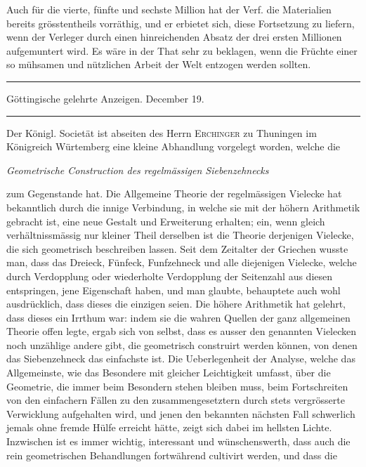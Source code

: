 %
Auch für die vierte, fünfte und sechste Million hat der Verf. die Materialien bereits grösstentheils vorräthig, und er erbietet sich, diese Fortsetzung zu liefern, wenn der Verleger durch einen hinreichenden Absatz der drei ersten Millionen aufgemuntert wird. Es wäre in der That sehr zu beklagen, wenn die Früchte einer so mühsamen und nützlichen Arbeit der Welt entzogen werden sollten.

\begin{center}
\rule{.86\linewidth}{.3pt}\par
Göttingische gelehrte Anzeigen. December 19.\par
\rule{.86\linewidth}{.3pt}
\end{center}
Der Königl. Societät ist abseiten des Herrn \textsc{Erchinger} zu Thuningen im Königreich Würtemberg eine kleine Abhandlung vorgelegt worden, welche die
\begin{center}\emph{Geometrische Construction des regelmässigen Siebenzehnecks}\end{center}
zum Gegenstande hat. Die Allgemeine Theorie der regelmässigen Vielecke hat bekanntlich durch die innige Verbindung, in welche sie mit der höhern Arithmetik gebracht ist, eine neue Gestalt und Erweiterung erhalten; ein, wenn gleich verhältnissmässig nur kleiner Theil derselben ist die Theorie derjenigen Vielecke, die sich geometrisch beschreiben lassen. Seit dem Zeitalter der Griechen wusste man, dass das Dreieck, Fünfeck, Funfzehneck und alle diejenigen Vielecke, welche durch Verdopplung oder wiederholte Verdopplung der Seitenzahl aus diesen entspringen, jene Eigenschaft haben, und man glaubte, behauptete auch wohl ausdrücklich, dass dieses die einzigen seien. Die höhere Arithmetik hat gelehrt, dass dieses ein Irrthum war: indem sie die wahren Quellen der ganz allgemeinen Theorie offen legte, ergab sich von selbst, dass es ausser den genannten Vielecken noch unzählige andere gibt, die geometrisch construirt werden können, von denen das Siebenzehneck das einfachste ist. Die Ueberlegenheit der Analyse, welche das Allgemeinste, wie das Besondere mit gleicher Leichtigkeit umfasst, über die Geometrie, die immer beim Besondern stehen bleiben muss, beim Fortschreiten von den einfachern Fällen zu den zusammengesetztern durch stets vergrösserte Verwicklung aufgehalten wird, und jenen den bekannten nächsten Fall schwerlich jemals ohne fremde Hülfe erreicht hätte, zeigt sich dabei im hellsten Lichte. Inzwischen ist es immer wichtig, interessant und wünschenswerth, dass auch die rein geometrischen Behandlungen fortwährend cultivirt werden, und dass die 
